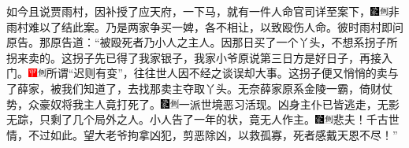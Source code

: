 如今且说贾雨村，因补授了应天府，一下马，就有一件人命官司详至案下，{\includegraphics[width=3mm]{../Images/00006}\includegraphics[width=3mm]{../Images/00011}\footnotesize \kaishu 非雨村难以了结此案。}乃是两家争买一婢，各不相让，以致殴伤人命。彼时雨村即问原告。那原告道：``被殴死者乃小人之主人。因那日买了一个丫头，不想系拐子所拐来卖的。这拐子先已得了我家银子，我家小爷原说第三日方是好日子，再接入门。{\includegraphics[width=3mm]{../Images/00002}\includegraphics[width=3mm]{../Images/00011}\footnotesize \kaishu 所谓``迟则有变''，往往世人因不经之谈误却大事。}这拐子便又悄悄的卖与了薛家，被我们知道了，去找那卖主夺取丫头。无奈薛家原系金陵一霸，倚财仗势，众豪奴将我主人竟打死了。{\includegraphics[width=3mm]{../Images/00006}\includegraphics[width=3mm]{../Images/00011}\footnotesize \kaishu 一派世境恶习活现。}凶身主仆已皆逃走，无影无踪，只剩了几个局外之人。小人告了一年的状，竟无人作主。{\includegraphics[width=3mm]{../Images/00006}\includegraphics[width=3mm]{../Images/00011}\footnotesize \kaishu 悲夫！千古世情，不过如此。}望大老爷拘拿凶犯，剪恶除凶，以救孤寡，死者感戴天恩不尽！''


